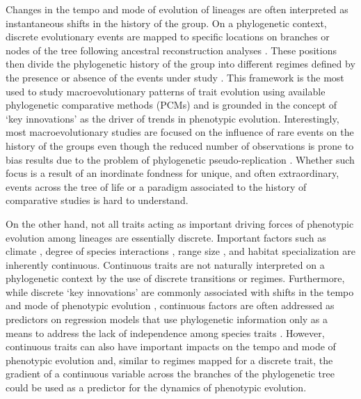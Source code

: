 Changes in the tempo and mode of evolution of lineages are often interpreted as instantaneous shifts in the history of the group. On a phylogenetic context, discrete evolutionary events are mapped to specific locations on branches or nodes of the tree following ancestral reconstruction analyses \citep{schluter_likelihood_1997, pagel_maximum_1999, huelsenbeck_stochastic_2003}. These positions then divide the phylogenetic history of the group into different regimes defined by the presence or absence of the events under study \citep{butler_phylogenetic_2004, omeara_testing_2006, revell_phylogenetic_2009, Eastman_2011, caetano_sysbio_2017}. This framework is the most used to study macroevolutionary patterns of trait evolution using available phylogenetic comparative methods (PCMs) and is grounded in the concept of `key innovations' \citep{simpson_1953, heard_key_1995} as the driver of trends in phenotypic evolution. Interestingly, most macroevolutionary studies are focused on the influence of rare events on the history of the groups even though the reduced number of observations is prone to bias results due to the problem of phylogenetic pseudo-replication \citep{maddison_unsolved_2015}. Whether such focus is a result of an inordinate fondness for unique, and often extraordinary, events across the tree of life or a paradigm associated to the history of comparative studies is hard to understand.

On the other hand, not all traits acting as important driving forces of phenotypic evolution among lineages are essentially discrete. Important factors such as climate \citep{hunt_simple_2015, clavel_accelerated_2017}, degree of species interactions \citep{galetti_functional_2013, thompson_diversification_2013}, range size \citep{Diniz_range_1998, pigot_speciation_2012}, and habitat specialization \citep{bonetti_evolution_2014, hardy_specialization_2014} are inherently continuous. Continuous traits are not naturally interpreted on a phylogenetic context by the use of discrete transitions or regimes. Furthermore, while discrete `key innovations' are commonly associated with shifts in the tempo and mode of phenotypic evolution \citep[e.g.,][]{revell_phylogenetic_2009, claverie_modularity_2011, benson_rates_2013, dececchi_body_2013, maddison_unsolved_2015}, continuous factors are often addressed as predictors on regression models that use phylogenetic information only as a means to address the lack of independence among species traits \citep{felsenstein_1985, grafen_phylogenetic_1989, blomberg_independent_2012}. However, continuous traits can also have important impacts on the tempo and mode of phenotypic evolution and, similar to regimes mapped for a discrete trait, the gradient of a continuous variable across the branches of the phylogenetic tree could be used as a predictor for the dynamics of phenotypic evolution.

